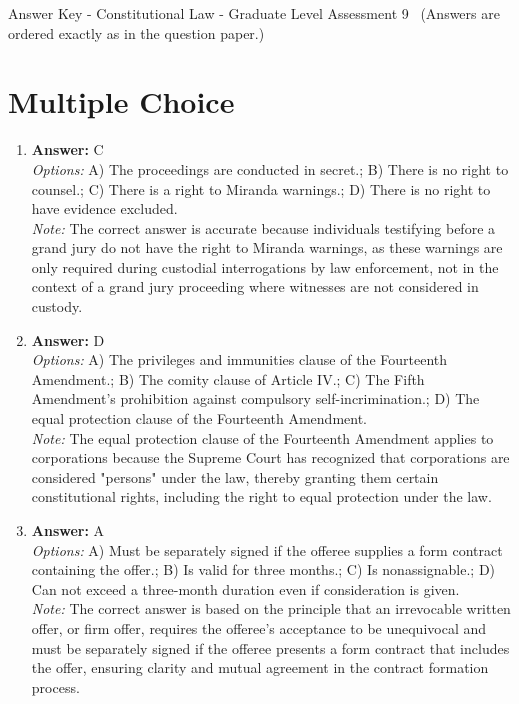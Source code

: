 \documentclass[12pt]{article}
\begin{document}
\begin{center}
Answer Key - Constitutional Law - Graduate Level Assessment 9 \
\small (Answers are ordered exactly as in the question paper.)
\end{center}

\section*{Multiple Choice}
\begin{enumerate}[label=\arabic*.]
\item \textbf{Answer:} C
\\ \textit{Options:} A) The proceedings are conducted in secret.; B) There is no right to counsel.; C) There is a right to Miranda warnings.; D) There is no right to have evidence excluded.
\\ \textit{Note:} The correct answer is accurate because individuals testifying before a grand jury do not have the right to Miranda warnings, as these warnings are only required during custodial interrogations by law enforcement, not in the context of a grand jury proceeding where witnesses are not considered in custody.
\item \textbf{Answer:} D
\\ \textit{Options:} A) The privileges and immunities clause of the Fourteenth Amendment.; B) The comity clause of Article IV.; C) The Fifth Amendment's prohibition against compulsory self-incrimination.; D) The equal protection clause of the Fourteenth Amendment.
\\ \textit{Note:} The equal protection clause of the Fourteenth Amendment applies to corporations because the Supreme Court has recognized that corporations are considered "persons" under the law, thereby granting them certain constitutional rights, including the right to equal protection under the law.
\item \textbf{Answer:} A
\\ \textit{Options:} A) Must be separately signed if the offeree supplies a form contract containing the offer.; B) Is valid for three months.; C) Is nonassignable.; D) Can not exceed a three-month duration even if consideration is given.
\\ \textit{Note:} The correct answer is based on the principle that an irrevocable written offer, or firm offer, requires the offeree's acceptance to be unequivocal and must be separately signed if the offeree presents a form contract that includes the offer, ensuring clarity and mutual agreement in the contract formation process.

\end{enumerate}
\end{document}

